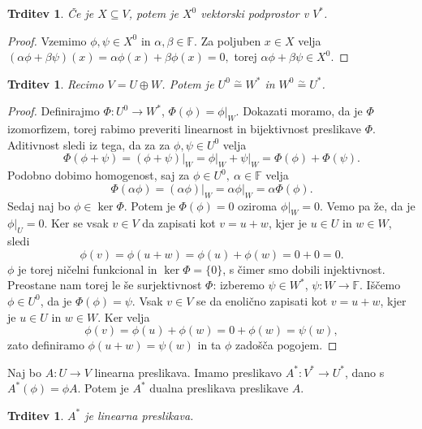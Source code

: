 \documentclass[10pt, a4paper]{article}
\newtheorem{trditev}[izr]{Trditev}
\newenvironment{noticeC}{%
  \tcolorbox[%
  notitle,
  empty,
  enhanced,  %
  breakable,
  coltext=black, 
  fontupper=\rmfamily,
  parbox=false,
  noparskip,
  sharp corners,
  boxrule=-1pt,  %
  frame hidden,
  left=7pt,  %
  right=7pt,
  top=5pt,
  bottom=5pt,
  before skip=2.5ex plus 2pt,
  after skip=2.5ex plus 2pt,
  overlay unbroken and last={%
  },
  ]}
{\endtcolorbox}
\newenvironment{dokaz}%
  {\begin{noticeC}\begin{proof}}%
  {\end{proof}\end{noticeC}}
\newcommand{\F}{\mathbb {F}}
\newcommand{\isom}{\stackrel{\sim}{=}}
\begin{document}
\begin{trditev}
    Če je $X \subseteq V$, potem je $X^0$ vektorski podprostor v $V^*$.
\end{trditev}

\begin{dokaz}
    Vzemimo $\phi, \psi \in X^0$ in $\alpha, \beta \in \F$. Za poljuben $x \in X$ velja
    $(\alpha \phi + \beta \psi) (x) = \alpha \phi (x) + \beta \phi (x) = 0,$
    torej $\alpha \phi + \beta \psi \in X^0$.
\end{dokaz}

\begin{trditev}
    Recimo $V = U \oplus W$. Potem je $U^0 \isom W^*$ in $W^0 \isom U^*$.
\end{trditev}

\begin{dokaz}
    Definirajmo $\Phi: U^0 \rightarrow W^*$, $\Phi(\phi) = \phi \big|_W$.
    Dokazati moramo, da je $\Phi$ izomorfizem, torej rabimo preveriti linearnost in bijektivnost preslikave $\Phi$.
    Aditivnost sledi iz tega, da za za $\phi, \psi \in U^0$ velja $$\Phi(\phi + \psi) = (\phi + \psi)\big|_W = \phi\big|_W + \psi\big|_W = \Phi(\phi) + \Phi(\psi).$$
    Podobno dobimo homogenost, saj za $\phi \in U^0,\ \alpha \in \F$ velja $$\Phi(\alpha \phi) = (\alpha \phi)\big|_W = \alpha \phi\big|_W = \alpha \Phi(\phi).$$
    Sedaj naj bo $\phi \in \ker \Phi$. Potem je $\Phi(\phi) = 0$ oziroma $\phi \big|_W = 0$.
        Vemo pa že, da je $\phi\big|_U = 0$. Ker se vsak $v \in V$ da zapisati kot $v = u + w$, kjer je $u \in U$ in $w \in W$, sledi
        $$\phi(v) = \phi(u + w) = \phi(u) + \phi(w) = 0+0 = 0.$$
        $\phi$ je torej ničelni funkcional in $\ker \Phi = \{0\}$, s čimer smo dobili injektivnost.
        Preostane nam torej le še surjektivnost $\Phi$: izberemo $\psi \in W^*$, $\psi: W \rightarrow \F$.
        Iščemo $\phi \in U^0$, da je $\Phi(\phi) = \psi$.
        Vsak $v \in V$ se da enolično zapisati kot $v = u + w$, kjer je $u \in U$ in $w \in W$.
        Ker velja $$\phi(v) = \phi(u) + \phi(w) = 0 + \phi(w) = \psi(w),$$
        zato definiramo $\phi(u+w) = \psi(w)$ in ta $\phi$ zadošča pogojem.
\end{dokaz}

Naj bo $A: U \rightarrow V$ linearna preslikava.
Imamo preslikavo $A^* : V^* \rightarrow U^*$, dano s $A^* (\phi) = \phi A$.
Potem je $A^*$ dualna preslikava preslikave $A$.

\begin{trditev}
    $A^*$ je linearna preslikava.
\end{trditev}
\end{document}
